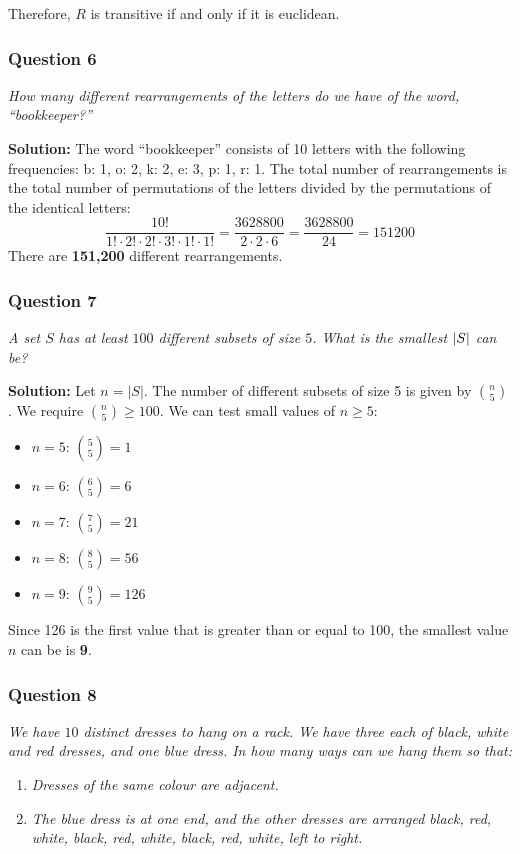 \documentclass[
	letterpaper, %
	11pt, %
]{CSUniSchoolLabReport}
\let\originalleft\left
\let\originalright\right
\renewcommand{\left}{\mathopen{}\mathclose\bgroup\originalleft}
\renewcommand{\right}{\aftergroup\egroup\originalright}
\begin{document}
Therefore, $R$ is transitive if and only if it is euclidean.

\pagebreak

\subsubsection*{Question 6}
\textit{How many different rearrangements of the letters do we have of the word, ``bookkeeper?''}

\textbf{Solution:}
The word ``bookkeeper'' consists of 10 letters with the following frequencies:
b: 1, o: 2, k: 2, e: 3, p: 1, r: 1.
The total number of rearrangements is the total number of permutations of the letters divided by the permutations of the identical letters:
\[
\frac{10!}{1! \cdot 2! \cdot 2! \cdot 3! \cdot 1! \cdot 1!} = \frac{3628800}{2 \cdot 2 \cdot 6} = \frac{3628800}{24} = 151200
\]
There are \textbf{151,200} different rearrangements.

\subsubsection*{Question 7}
\textit{A set $S$ has at least $100$ different subsets of size $5$. What is the smallest $\left|S\right|$ can be?}

\textbf{Solution:}
Let $n = |S|$. The number of different subsets of size 5 is given by $\binom{n}{5}$.
We require $\binom{n}{5} \ge 100$. We can test small values of $n \ge 5$:
\begin{itemize}
    \item $n = 5$: $\binom{5}{5} = 1$
    \item $n = 6$: $\binom{6}{5} = 6$
    \item $n = 7$: $\binom{7}{5} = 21$
    \item $n = 8$: $\binom{8}{5} = 56$
    \item $n = 9$: $\binom{9}{5} = 126$
\end{itemize}
Since 126 is the first value that is greater than or equal to 100, the smallest value $n$ can be is \textbf{9}.

\pagebreak
\subsubsection*{Question 8}
\textit{We have $10$ distinct dresses to hang on a rack. We have three each of black, white and red dresses, and one blue dress. In how many ways can we hang them so that:}
\begin{enumerate}
\item \textit{Dresses of the same colour are adjacent.}
\item \textit{The blue dress is at one end, and the other dresses are arranged black, red, white, black, red, white, black, red, white, left to right.}
\end{enumerate}
\end{document}
